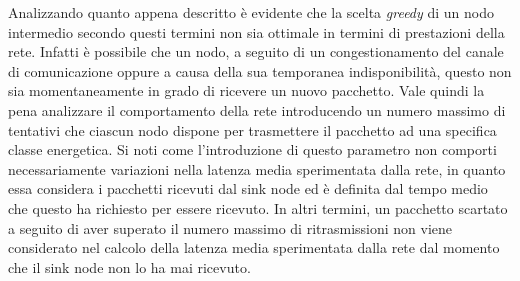 \documentclass[binding=0.6cm,TFA]{sapthesis}
\begin{document}
Analizzando quanto appena descritto è evidente che la scelta \emph{greedy} di un nodo intermedio secondo questi termini non sia ottimale in termini di prestazioni
della rete. Infatti è possibile che un nodo, a seguito di un congestionamento del canale di comunicazione oppure a causa della sua temporanea indisponibilità,
questo non sia momentaneamente in grado di ricevere un nuovo pacchetto. Vale quindi la pena analizzare il comportamento della rete introducendo un numero massimo di
tentativi che ciascun nodo dispone per trasmettere il pacchetto ad una specifica classe energetica. Si noti come l'introduzione di questo parametro non
comporti necessariamente variazioni nella latenza media sperimentata dalla rete, in quanto essa considera i pacchetti ricevuti dal sink node ed è definita
dal tempo medio che questo ha richiesto per essere ricevuto. In altri termini, un pacchetto scartato a seguito di aver superato il numero massimo
di ritrasmissioni non viene considerato nel calcolo della latenza media sperimentata dalla rete dal momento che il sink node non lo ha mai ricevuto.
\end{document}
